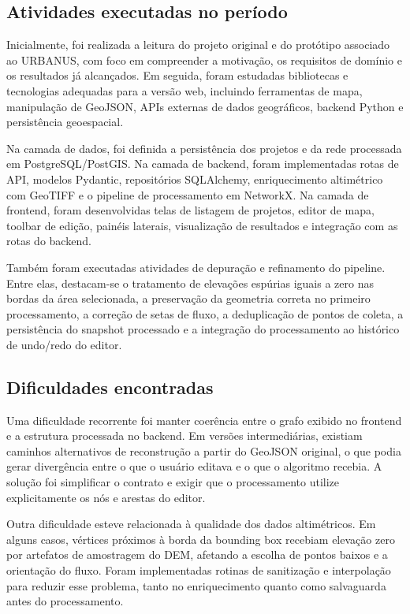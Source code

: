 \documentclass[12pt,a4paper]{article}
\begin{document}
\subsection{Atividades executadas no período}

Inicialmente, foi realizada a leitura do projeto original e do protótipo associado ao URBANUS, com foco em compreender a motivação, os requisitos de domínio e os resultados já alcançados. Em seguida, foram estudadas bibliotecas e tecnologias adequadas para a versão web, incluindo ferramentas de mapa, manipulação de GeoJSON, APIs externas de dados geográficos, backend Python e persistência geoespacial.

Na camada de dados, foi definida a persistência dos projetos e da rede processada em PostgreSQL/PostGIS. Na camada de backend, foram implementadas rotas de API, modelos Pydantic, repositórios SQLAlchemy, enriquecimento altimétrico com GeoTIFF e o pipeline de processamento em NetworkX. Na camada de frontend, foram desenvolvidas telas de listagem de projetos, editor de mapa, toolbar de edição, painéis laterais, visualização de resultados e integração com as rotas do backend.

Também foram executadas atividades de depuração e refinamento do pipeline. Entre elas, destacam-se o tratamento de elevações espúrias iguais a zero nas bordas da área selecionada, a preservação da geometria correta no primeiro processamento, a correção de setas de fluxo, a deduplicação de pontos de coleta, a persistência do snapshot processado e a integração do processamento ao histórico de undo/redo do editor.

\subsection{Dificuldades encontradas}

Uma dificuldade recorrente foi manter coerência entre o grafo exibido no frontend e a estrutura processada no backend. Em versões intermediárias, existiam caminhos alternativos de reconstrução a partir do GeoJSON original, o que podia gerar divergência entre o que o usuário editava e o que o algoritmo recebia. A solução foi simplificar o contrato e exigir que o processamento utilize explicitamente os nós e arestas do editor.

Outra dificuldade esteve relacionada à qualidade dos dados altimétricos. Em alguns casos, vértices próximos à borda da bounding box recebiam elevação zero por artefatos de amostragem do DEM, afetando a escolha de pontos baixos e a orientação do fluxo. Foram implementadas rotinas de sanitização e interpolação para reduzir esse problema, tanto no enriquecimento quanto como salvaguarda antes do processamento.
\end{document}
